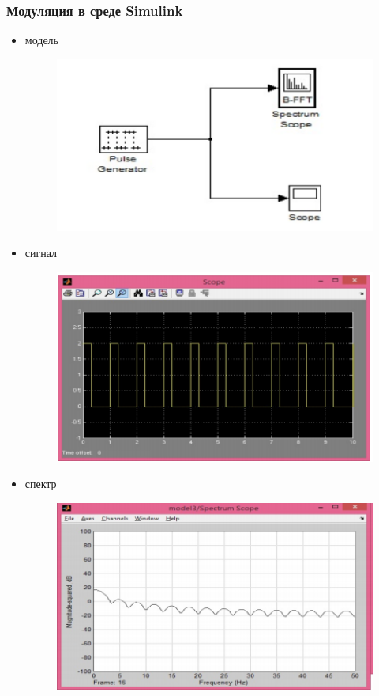 \documentclass[10pt,a4paper]{article}
\begin{document}
\subsubsection{Модуляция в среде Simulink}
\begin{itemize}
\item модель
\begin{figure}[h]
\centering
\includegraphics[width=12cm]{sim5_4.png} 
\end{figure}
\item сигнал
\begin{figure}[h]
\centering
\includegraphics[width=12cm]{sim5_5.png} 
\end{figure}
\item спектр
\begin{figure}[h]
\centering
\includegraphics[width=12cm]{sim5_6.png} 
\end{figure}
\end{itemize}
\FloatBarrier
\end{document}
